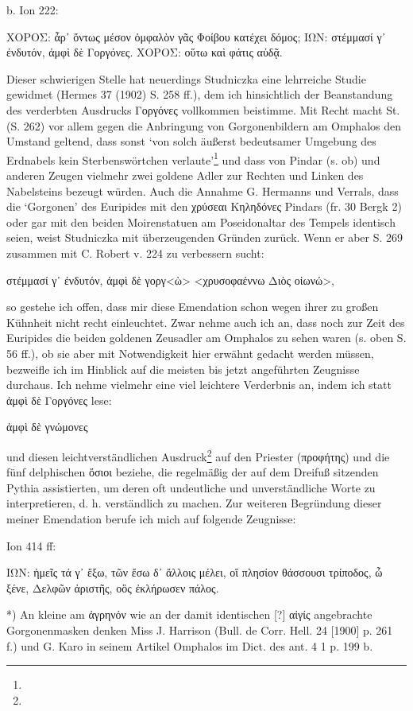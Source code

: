 \documentclass[a4paper, 11pt, oneside]{article}
\begin{document}
b. Ion 222:

ΧΟΡΟΣ:  
ἆρ᾽ ὄντως μέσον ὀμφαλὸν  
γᾶς Φοίβου κατέχει δόμος;  
ΙΩΝ:  
στέμμασί γ᾽ ἐνδυτόν, ἀμφὶ δὲ Γοργόνες.  
ΧΟΡΟΣ:  
οὕτω καὶ φάτις αὐδᾷ.

Dieser schwierigen Stelle hat neuerdings Studniczka eine lehrreiche Studie gewidmet (Hermes 37 (1902) S. 258 ff.), dem ich hinsichtlich der Beanstandung des verderbten Ausdrucks Γοργόνες vollkommen beistimme. Mit Recht macht St. (S. 262) vor allem gegen die Anbringung von Gorgonenbildern am Omphalos den Umstand geltend, dass sonst `von solch äußerst bedeutsamer Umgebung des Erdnabels kein Sterbenswörtchen verlaute'\footnote{} und dass von Pindar (s. ob) und anderen Zeugen vielmehr zwei goldene Adler zur Rechten und Linken des Nabelsteins bezeugt würden. Auch die Annahme G. Hermanns und Verrals, dass die `Gorgonen' des Euripides mit den χρύσεαι Κηληδόνες Pindars (fr. 30 Bergk 2) oder gar mit den beiden Moirenstatuen am Poseidonaltar des Tempels identisch seien, weist Studniczka mit überzeugenden Gründen zurück. Wenn er aber S. 269 zusammen mit C. Robert v. 224 zu verbessern sucht:

στέμμασί γ᾽ ἐνδυτόν, ἀμφὶ δὲ γοργ<ὼ>  
<χρυσοφαέννω Διὸς οἰωνώ>,

so gestehe ich offen, dass mir diese Emendation schon wegen ihrer zu großen Kühnheit nicht recht einleuchtet. Zwar nehme auch ich an, dass noch zur Zeit des Euripides die beiden goldenen Zeusadler am Omphalos zu sehen waren (s. oben S. 56 ff.), ob sie aber mit Notwendigkeit hier erwähnt gedacht werden müssen, bezweifle ich im Hinblick auf die meisten bis jetzt angeführten Zeugnisse durchaus. Ich nehme vielmehr eine viel leichtere Verderbnis an, indem ich statt ἀμφὶ δὲ Γοργόνες lese:

ἀμφὶ δὲ γνώμονες

und diesen leichtverständlichen Ausdruck\footnote{} auf den Priester (προφήτης) und die fünf delphischen ὄσιοι beziehe, die regelmäßig der auf dem Dreifuß sitzenden Pythia assistierten, um deren oft undeutliche und unverständliche Worte zu interpretieren, d. h. verständlich zu machen. Zur weiteren Begründung dieser meiner Emendation berufe ich mich auf folgende Zeugnisse:

Ion 414 ff:

ΙΩΝ:  
ἡμεῖς τά γ᾽ ἔξω, τῶν ἔσω δ᾽ ἄλλοις μέλει,  
οἵ πλησίον θάσσουσι τρίποδος, ὦ ξένε,  
Δελφῶν ἀριστῆς, οὃς ἐκλήρωσεν πάλος.

*) An kleine am ἀγρηνόν wie an der damit identischen [?] αἰγίς angebrachte Gorgonenmasken denken Miss J. Harrison (Bull. de Corr. Hell. 24 [1900] p. 261 f.) und G. Karo in seinem Artikel Omphalos im Dict. des ant. 4 1 p. 199 b.
\end{document}
